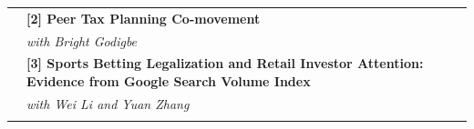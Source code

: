 \documentclass[letterpaper, 11pt]{article}
\begin{document}
\begin{longtable}{p{1.15in}p{5.05in}}
& \textbf{[2] Peer Tax Planning Co-movement} \\
& \textit{with Bright Godigbe} \\

& \textbf{[3] Sports Betting Legalization and Retail Investor Attention: Evidence from Google Search Volume Index} \\
& \textit{with Wei Li and Yuan Zhang} \\ \\

 




\end{longtable}
\end{document}
